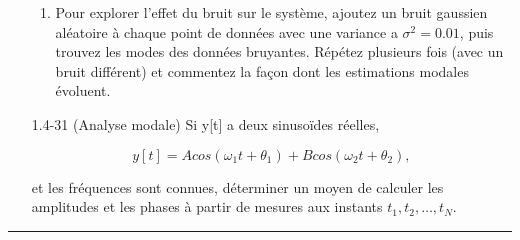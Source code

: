 \documentclass[10pt,twoside,a4paper]{book}
\begin{document}
\begin{enumerate}
\begin{enumerate}
    \item Pour explorer l'effet du bruit sur le système, ajoutez un bruit gaussien aléatoire à chaque point de données avec une variance a $\sigma^2 = 0.01$, puis trouvez les modes des données bruyantes. Répétez plusieurs fois (avec un bruit différent) et commentez la façon dont les estimations modales évoluent.
  \end{enumerate}

  \item[1.4-31] (Analyse modale) Si y[t] a deux sinusoïdes réelles,
  
  \begin{equation*}
    y[t] = A cos(\omega_1t + \theta_1) + B cos(\omega_2t + \theta_2),
  \end{equation*}

  \noindent
  et les fréquences sont connues, déterminer un moyen de calculer les amplitudes et les phases à partir de mesures aux instants $t_1, t_2, \ldots, t_N$.
\end{enumerate}

\par\noindent\rule{\textwidth}{0.6pt}
\end{document}
